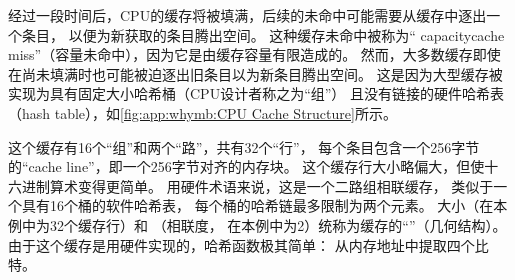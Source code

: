 经过一段时间后，CPU的缓存将被填满，后续的未命中可能需要从缓存中逐出一个条目，
以便为新获取的条目腾出空间。
这种缓存未命中被称为``
{capacity}{cache miss}''（容量未命中），因为它是由缓存容量有限造成的。
然而，大多数缓存即使在尚未填满时也可能被迫逐出旧条目以为新条目腾出空间。
这是因为大型缓存被实现为具有固定大小哈希桶（CPU设计者称之为``组''）
且没有链接的硬件哈希表（hash table），如\cref{fig:app:whymb:CPU Cache Structure}所示。

这个缓存有16个``组''和两个``路''，共有32个``行''，
每个条目包含一个256字节的``cache line''，即一个256字节对齐的内存块。
这个缓存行大小略偏大，但使十六进制算术变得更简单。
用硬件术语来说，这是一个二路组相联缓存，
类似于一个具有16个桶的软件哈希表，
每个桶的哈希链最多限制为两个元素。
大小（在本例中为32个缓存行）和
（相联度，
在本例中为2）统称为缓存的``''（几何结构）。
由于这个缓存是用硬件实现的，哈希函数极其简单：
从内存地址中提取四个比特。

